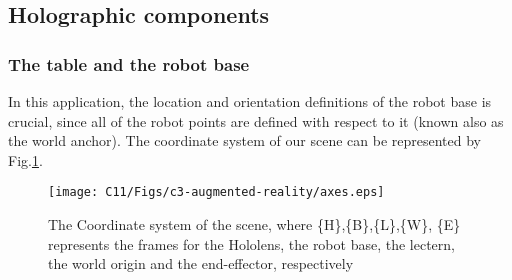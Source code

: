 \subsection{Holographic components}

\subsubsection{The table and the robot base}

In this application, the location and orientation definitions of the robot base is crucial, since all of the robot points are defined with respect to it (known also as the world anchor). The coordinate system of our scene can be represented by Fig.\ref{fig:axes}.

\begin{figure}[!t]
    \centering
    \texttt{[image: C11/Figs/c3-augmented-reality/axes.eps]}
    \caption{The Coordinate system of the scene, where \{H\},\{B\},\{L\},\{W\}, \{E\} represents the frames for the Hololens, the robot base, the lectern, the world origin and the end-effector, respectively}
    \label{fig:axes}
\end{figure}

